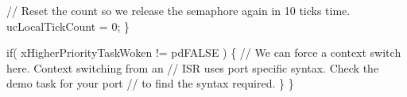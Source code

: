 \begin{DoxyPre}       // Reset the count so we release the semaphore again in 10 ticks time.
       ucLocalTickCount = 0;
   \}\end{DoxyPre}



\begin{DoxyPre}   if( xHigherPriorityTaskWoken != pdFALSE )
   \{
       // We can force a context switch here.  Context switching from an
       // ISR uses port specific syntax.  Check the demo task for your port
       // to find the syntax required.
   \}
\}
\end{DoxyPre}
 